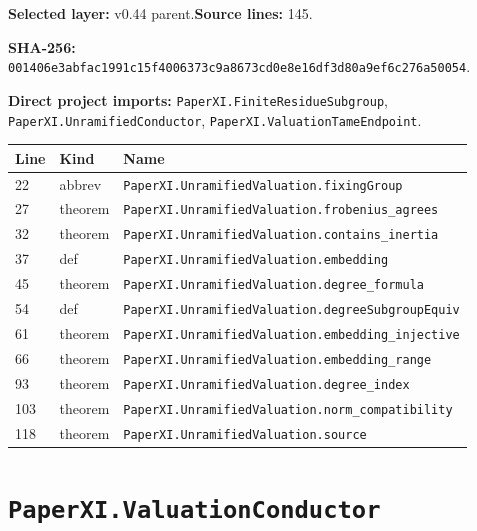 \documentclass[10pt,oneside]{book}
\begin{document}
\textbf{Selected layer:} v0.44 parent.\quad\textbf{Source lines:} 145.\par\textbf{SHA-256:} {\scriptsize\nolinkurl{001406e3abfac1991c15f4006373c9a8673cd0e8e16df3d80a9ef6c276a50054}}.


\textbf{Direct project imports:} \nolinkurl{PaperXI.FiniteResidueSubgroup}, \nolinkurl{PaperXI.UnramifiedConductor}, \nolinkurl{PaperXI.ValuationTameEndpoint}.

\begin{longtable}{@{}p{}p{}p{}@{}}\toprule Line&Kind&Name\\\midrule\endhead

22&abbrev&\nolinkurl{PaperXI.UnramifiedValuation.fixingGroup}\\

27&theorem&\nolinkurl{PaperXI.UnramifiedValuation.frobenius_agrees}\\

32&theorem&\nolinkurl{PaperXI.UnramifiedValuation.contains_inertia}\\

37&def&\nolinkurl{PaperXI.UnramifiedValuation.embedding}\\

45&theorem&\nolinkurl{PaperXI.UnramifiedValuation.degree_formula}\\

54&def&\nolinkurl{PaperXI.UnramifiedValuation.degreeSubgroupEquiv}\\

61&theorem&\nolinkurl{PaperXI.UnramifiedValuation.embedding_injective}\\

66&theorem&\nolinkurl{PaperXI.UnramifiedValuation.embedding_range}\\

93&theorem&\nolinkurl{PaperXI.UnramifiedValuation.degree_index}\\

103&theorem&\nolinkurl{PaperXI.UnramifiedValuation.norm_compatibility}\\

118&theorem&\nolinkurl{PaperXI.UnramifiedValuation.source}\\

\bottomrule\end{longtable}

\section{\texorpdfstring{\nolinkurl{PaperXI.ValuationConductor}}{PaperXI.ValuationConductor}}\label{module:PaperXI.ValuationConductor}
\end{document}
